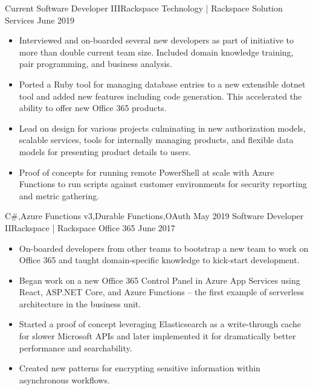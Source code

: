 \begin{experiences}
  \experience
    {Current}       {Software Developer III}{Rackspace Technology | Rackspace Solution Services}
    {June 2019}     {
                      \begin{itemize}
                        \item Interviewed and on-boarded several new developers as part of initiative to more than double current team size. Included domain knowledge training, pair programming, and business analysis.
                        \item Ported a Ruby tool for managing database entries to a new extensible dotnet tool and added new features including code generation. This accelerated the ability to offer new Office 365 products.
                        \item Lead on design for various projects culminating in new authorization models, scalable services, tools for internally managing products, and flexible data models for presenting product details to users.
                        \item Proof of concepts for running remote PowerShell at scale with Azure Functions to run scripts against customer environments for security reporting and metric gathering.
                      \end{itemize}
                    }
                    {C\#,Azure Functions v3,Durable Functions,OAuth}
  \emptySeparator
  \experience
    {May 2019}     {Software Developer II}{Rackspace | Rackspace Office 365}
    {June 2017}    {
                      \begin{itemize}
                        \item On-boarded developers from other teams to bootstrap a new team to work on Office 365 and taught domain-specific knowledge to kick-start development.
                        \item Began work on a new Office 365 Control Panel in Azure App Services using React, ASP.NET Core, and Azure Functions – the first example of serverless architecture in the business unit.
                        \item Started a proof of concept leveraging Elasticsearch as a write-through cache for slower Microsoft APIs and later implemented it for dramatically better performance and searchability.
                        \item Created new patterns for encrypting sensitive information within asynchronous workflows.

\end{itemize}}
\end{experiences}
